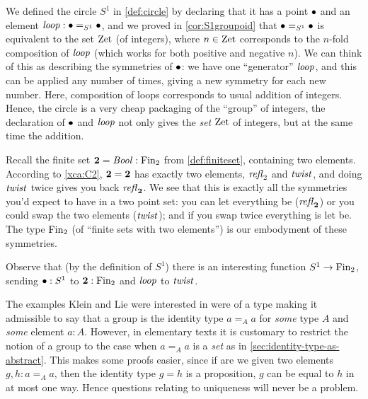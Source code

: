 \begin{example}\label{ex:base=base}
  We defined the circle $S^1$ in \cref{def:circle} by declaring that it has a point $\bullet$ and an element $\mathit{loop}:\bullet=_{S^1}\bullet$, and we proved in \cref{cor:S1groupoid} that $\bullet=_{S^1}\bullet$ is equivalent to the set $\mathrm{Zet}$ (of integers), where $n\in\mathrm{Zet}$ corresponds to the $n$-fold composition of $\mathit{loop}$ (which works for both positive and negative $n$).  
We can think of this as describing the symmetries of $\bullet$: we have one ``generator'' $\mathit{loop}$, and this can be applied any number of times, giving a new symmetry for each new number.  
Here, composition of loops corresponds to usual addition of integers.  Hence, the circle is a very cheap packaging of the ``{group}'' of integers, the declaration of $\bullet$ and $\mathit{loop}$ not only gives the \emph{set} $\mathrm{Zet}$ of integers, but at the same time the addition.
\end{example}
\begin{example}
  Recall the finite set $\mathbf{2} =\mathop{\mathit{Bool}}:\operatorname{Fin}_2$ from \cref{def:finiteset}, containing two elements.   
According to \cref{xca:C2}, $\mathbf{2} =\mathbf{2} $ has exactly two elements, $\mathop{{\it refl}_{\mathrm 2}}$ and $\mathit{twist}$, and doing $\mathit{twist}$ twice gives you back $\mathop{{\it refl}_{\mathbf{2} }}$.  
We see that this is exactly all the symmetries you'd expect to have in a two point set: you can let everything be ($\mathop{{\it refl}_{\mathbf{2} }}$) or you could swap the two elements ($\mathit{twist}$); and if you swap twice everything is let be.  
The type $\operatorname{Fin}_2$ (of ``finite sets with two elements'') is our embodyment of these symmetries.  

Observe that (by the definition of $S^1$) there is an interesting function $S^1\to\operatorname{Fin}_2$, sending $\bullet:S^1$ to $\mathbf{2} :\operatorname{Fin}_2$ and $\mathit{loop}$ to $\mathit{twist}$.
\end{example}


The examples Klein and Lie were interested in were of a type making it admissible to say that a group is the identity type $a=_Aa$ for \emph{some} type $A$ and \emph{some} element $a:A$.
However, in elementary texts it is customary to restrict the notion of a group to the case when $a=_Aa$ is a \emph{set} as in \cref{sec:identity-type-as-abstract}.  This makes some proofs easier, since if are we given two elements $g,h:a=_Aa$, then the identity type $g=h$ is a proposition, \ie $g$ can be equal to $h$ in at most one way.  Hence questions relating to uniqueness will never be a problem.



